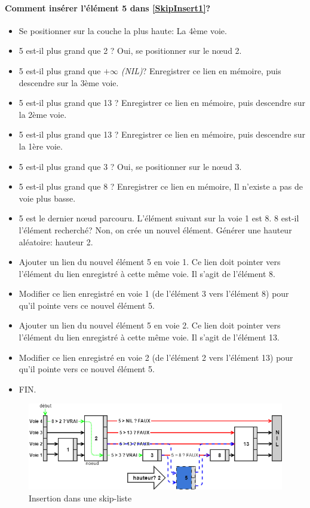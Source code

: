 \documentclass[hidelinks,a4paper, 12pt]{article}
\begin{document}
	\newpage
	\paragraph*{Comment insérer l'élément 5 dans \cref{SkipInsert1}?}
	\begin{itemize}
		\item Se positionner sur la couche la plus haute: La 4ème voie.
		\item 5 est-il plus grand que 2 ? Oui, se positionner sur le nœud 2.
		\item 5 est-il plus grand que $+\infty$ \textit{(NIL)}? Enregistrer ce lien en mémoire, puis descendre sur la 3ème voie.
		\item 5 est-il plus grand que 13 ? Enregistrer ce lien en mémoire, puis descendre sur la 2ème voie.
		\item 5 est-il plus grand que 13 ? Enregistrer ce lien en mémoire, puis descendre sur la 1ère voie.
		\item 5 est-il plus grand que 3 ? Oui, se positionner sur le nœud 3.
		\item 5 est-il plus grand que 8 ? Enregistrer ce lien en mémoire, Il n'existe a pas de voie plus basse.
		\item 5 est le dernier nœud parcouru. L'élément suivant sur la voie 1 est 8. 8 est-il l'élément recherché? Non, on crée un nouvel élément. Générer une hauteur aléatoire: hauteur 2.
		\item Ajouter un lien du nouvel élément 5 en voie 1. Ce lien doit pointer vers l'élément du lien enregistré à cette même voie. Il s'agit de l'élément 8.
		\item Modifier ce lien enregistré en voie 1 (de l'élément 3 vers l'élément 8) pour qu'il pointe vers ce nouvel élément 5.
		\item Ajouter un lien du nouvel élément 5 en voie 2. Ce lien doit pointer vers l'élément du lien enregistré à cette même voie. Il s'agit de l'élément 13.
		\item Modifier ce lien enregistré en voie 2 (de l'élément 2 vers l'élément 13) pour qu'il pointe vers ce nouvel élément 5.
		\item FIN.
	\end{itemize}
	\begin{figure}[h]
		\includegraphics[width=\textwidth]{img/insert2}
		\caption{Insertion dans une skip-liste}
		\label{SkipInsert2}
	\end{figure}
	
\end{document}
